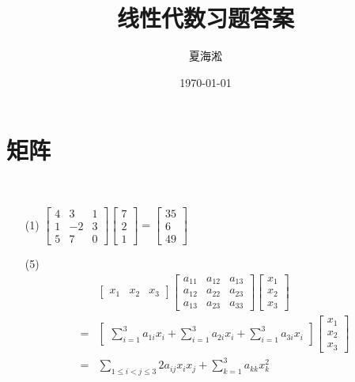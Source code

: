 \documentclass{ctexart}
\author{夏海淞}
\title{线性代数习题答案}
\date{\today}
\begin{document}
\maketitle
\tableofcontents
\section{矩阵}

\begin{problem}\

\begin{enumerate}
    \item[(1)] \(\begin{bmatrix}
            4 & 3 & 1 \\1&-2&3\\5&7&0
        \end{bmatrix}\begin{bmatrix}
            7 \\2\\1
        \end{bmatrix}=\begin{bmatrix}
            35 \\6\\49
        \end{bmatrix}\)
    \item[(5)]
        \begin{align*}
              & \begin{bmatrix}
                    x_1 & x_2 & x_3
                \end{bmatrix}
            \begin{bmatrix}
                a_{11} & a_{12} & a_{13} \\
                a_{12} & a_{22} & a_{23} \\
                a_{13} & a_{23} & a_{33}
            \end{bmatrix}
            \begin{bmatrix}
                x_1 \\x_2\\x_3
            \end{bmatrix}                                                                                    \\
            = & \begin{bmatrix}\sum_{i=1}^3a_{1i}x_i+\sum_{i=1}^3a_{2i}x_i+\sum_{i=1}^3a_{3i}x_i\end{bmatrix}
            \begin{bmatrix}x_1 \\x_2 \\x_3\end{bmatrix}                                                       \\
            = & \sum_{1 \leq i<j \leq 3} 2 a_{i j} x_i x_j+\sum_{k=1}^3 a_{k k} x_k^2
        \end{align*}

\end{enumerate}
\end{problem}
\end{document}
